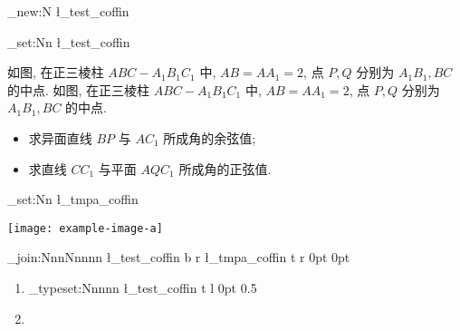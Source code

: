 \documentclass{ctexart}
\begin{document}
\ExplSyntaxOn
\coffin_new:N \l_test_coffin

\hcoffin_set:Nn \l_test_coffin
  {
    \begin{varwidth}{\hsize}
      如图, 在正三棱柱 $A B C-A_{1} B_{1} C_{1}$ 中, $A B=A A_{1}=2$, 点 $P, Q$ 分别为 $A_{1} B_{1}, B C$ 的中点.
     如图, 在正三棱柱 $A B C-A_{1} B_{1} C_{1}$ 中, $A B=A A_{1}=2$, 点 $P, Q$ 分别为 $A_{1} B_{1}, B C$ 的中点.
      \begin{itemize}
        \item 求异面直线 $B P$ 与 $A C_{1}$ 所成角的余弦值;
        \item 求直线 $C C_{1}$ 与平面 $A Q C_{1}$ 所成角的正弦值.
      \end{itemize}
    \end{varwidth}
  }
\hcoffin_set:Nn \l_tmpa_coffin
  {
    \begin{varwidth}{\hsize}
      \texttt{[image: example-image-a]}
    \end{varwidth}
  }
\coffin_join:NnnNnnnn
  \l_test_coffin { b } { r }
  \l_tmpa_coffin { t } { r }
  { 0pt } { 0pt }
\begin{enumerate}
  \item \coffin_typeset:Nnnnn 
    \l_test_coffin { t } { l }
    { 0pt } { 0.5\baselineskip }
  \item {}
\end{enumerate}


\ExplSyntaxOff
\end{document}
